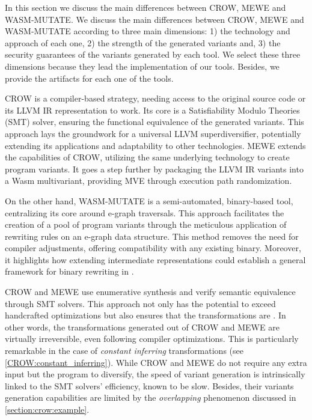 

In this section we discuss the main differences between CROW, MEWE and WASM-MUTATE.
We discuss the main differences between CROW, MEWE and WASM-MUTATE according to three main dimensions: 1) the technology and approach of each one, 2) the strength of the generated variants and, 3) the security guarantees of the variants generated by each tool.
We select these three dimensions because they lead the implementation of our tools.
Besides, we provide the artifacts for each one of the tools.

CROW is a compiler-based strategy, needing access to the original source code or its LLVM IR representation to work. 
Its core is a Satisfiability Modulo Theories (SMT) solver, ensuring the functional equivalence of the generated variants.
This approach lays the groundwork for a universal LLVM superdiversifier, potentially extending its applications and adaptability to other technologies.
MEWE extends the capabilities of CROW, utilizing the same underlying technology to create program variants. 
It goes a step further by packaging the LLVM IR variants into a Wasm multivariant, providing MVE through execution path randomization.

On the other hand, WASM-MUTATE is a semi-automated, binary-based tool, centralizing its core around e-graph traversals. 
This approach facilitates the creation of a pool of \Wasm program variants through the meticulous application of rewriting rules on an e-graph data structure. 
This method removes the need for compiler adjustments, offering compatibility with any existing \Wasm binary. 
Moreover, it highlights how extending intermediate representations could establish a general framework for binary rewriting in \Wasm.

CROW and MEWE use enumerative synthesis and verify semantic equivalence through SMT solvers. 
This approach not only has the potential to exceed handcrafted optimizations but also ensures that the transformations are . 
In other words, the transformations generated out of CROW and MEWE are virtually irreversible, even following compiler optimizations. 
This is particularly remarkable in the case of \emph{constant inferring} transformations (see \autoref{CROW:constant_inferring}).
While CROW and MEWE do not require any extra input but the program to diversify, the speed of variant generation is intrinsically linked to the SMT solvers' efficiency, known to be slow. 
Besides, their variants generation capabilities are limited by the \emph{overlapping} phenomenon discussed in \autoref{section:crow:example}.

